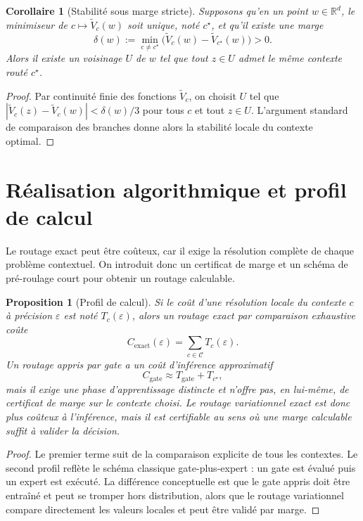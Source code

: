 \documentclass[11pt,a4paper]{article}
\newtheorem{proposition}{Proposition}[section]
\newtheorem{corollary}{Corollaire}[section]
\newcommand{\R}{\mathbb R}
\newcommand{\Ccal}{\mathcal C}
\begin{document}
\begin{corollary}[Stabilité sous marge stricte]
Supposons qu'en un point \(w\in\R^d\), le minimiseur de \(c\mapsto\widetilde V_c(w)\) soit unique, noté \(c^\star\), et qu'il existe une marge
\[
\delta(w):=\min_{c\neq c^\star}\bigl(\widetilde V_c(w)-\widetilde V_{c^\star}(w)\bigr)>0.
\]
Alors il existe un voisinage \(U\) de \(w\) tel que tout \(z\in U\) admet le même contexte routé \(c^\star\).
\end{corollary}

\begin{proof}
Par continuité finie des fonctions \(\widetilde V_c\), on choisit \(U\) tel que \(|\widetilde V_c(z)-\widetilde V_c(w)|<\delta(w)/3\) pour tous \(c\) et tout \(z\in U\). L'argument standard de comparaison des branches donne alors la stabilité locale du contexte optimal.
\end{proof}

\section{Réalisation algorithmique et profil de calcul}

Le routage exact peut être coûteux, car il exige la résolution complète de chaque problème contextuel. On introduit donc un certificat de marge et un schéma de pré-roulage court pour obtenir un routage calculable.

\begin{proposition}[Profil de calcul]
Si le coût d'une résolution locale du contexte \(c\) à précision \(\varepsilon\) est noté \(T_c(\varepsilon)\), alors un routage exact par comparaison exhaustive coûte
\[
C_{\mathrm{exact}}(\varepsilon)=\sum_{c\in\Ccal}T_c(\varepsilon).
\]
Un routage appris par gate a un coût d'inférence approximatif
\[
C_{\mathrm{gate}}\approx T_{\mathrm{gate}}+T_{c^\star},
\]
mais il exige une phase d'apprentissage distincte et n'offre pas, en lui-même, de certificat de marge sur le contexte choisi. Le routage variationnel exact est donc plus coûteux à l'inférence, mais il est certifiable au sens où une marge calculable suffit à valider la décision.
\end{proposition}

\begin{proof}
Le premier terme suit de la comparaison explicite de tous les contextes. Le second profil reflète le schéma classique gate-plus-expert : un gate est évalué puis un expert est exécuté. La différence conceptuelle est que le gate appris doit être entraîné et peut se tromper hors distribution, alors que le routage variationnel compare directement les valeurs locales et peut être validé par marge.
\end{proof}
\end{document}
